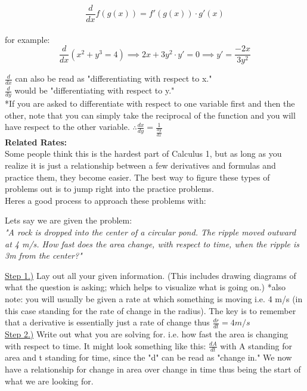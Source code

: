 \documentclass[fleqn]{article}
\begin{document}
\[\frac{d}{dx}f(g(x)) = f'(g(x))\cdot g'(x)\]
\\
for example:
\[\frac{d}{dx}(x^2 + y^3 = 4) \implies 2x + 3y^2\cdot y' = 0 \implies y' = \frac{-2x}{3y^2}\]

$\frac{d}{dx}$ can also be read as "differentiating with respect to x."
\\

$\frac{d}{dy}$ would be "differentiating with respect to y."
\\

*If you are asked to differentiate with respect to one variable first and then the other, note that you can simply take the reciprocal of the function and you will have respect to the other variable. $\therefore \frac{dx}{dy} = \frac{1}{\frac{dy}{dx}}$
\\

\textbf{Related Rates: }
\\

Some people think this is the hardest part of Calculus 1, but as long as you realize it is just a relationship between a few derivatives and formulas and practice them, they become easier. The best way to figure these types of problems out is to jump right into the practice problems.
\\

Heres a good process to approach these problems with: 
\\


\begin{center}
    
    Lets say we are given the problem:
    \\ 
    \textit{"A rock is dropped into the center of a circular pond. The ripple moved outward at 4 m/s. How fast does the area change, with respect to time, when the ripple is 3m from the center?"}

\end{center}

\underline{Step 1.)} Lay out all your given information. (This includes drawing diagrams of what the question is asking; which helps to visualize what is going on.) *also note: you will usually be given a rate at which something is moving i.e. 4 m/s (in this case standing for the rate of change in the radius). The key is to remember that a derivative is essentially just a rate of change thus $\frac{dr}{dt} = 4m/s$
\\

\underline{Step 2.)} Write out what you are solving for. i.e. how fast the area is changing with respect to time. It might look something like this: $\frac{dA}{dt}$ with A standing for area and t standing for time, since the "d"  can be read as "change in." We now have a relationship for change in area over change in time thus being the start of what we are looking for. 
\\
\end{document}
